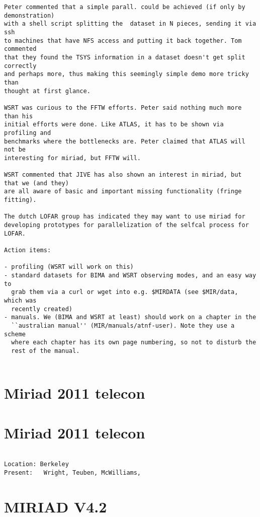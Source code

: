 \begin{verbatim}
Peter commented that a simple parall. could be achieved (if only by demonstration)
with a shell script splitting the  dataset in N pieces, sending it via ssh
to machines that have NFS access and putting it back together. Tom commented
that they found the TSYS information in a dataset doesn't get split correctly
and perhaps more, thus making this seemingly simple demo more tricky than
thought at first glance.

WSRT was curious to the FFTW efforts. Peter said nothing much more than his
initial efforts were done. Like ATLAS, it has to be shown via profiling and
benchmarks where the bottlenecks are. Peter claimed that ATLAS will not be
interesting for miriad, but FFTW will.

WSRT commented that JIVE has also shown an interest in miriad, but that we (and they)
are all aware of basic and important missing functionality (fringe fitting). 

The dutch LOFAR group has indicated they may want to use miriad for
developing prototypes for parallelization of the selfcal process for
LOFAR.

Action items:

- profiling (WSRT will work on this)
- standard datasets for BIMA and WSRT observing modes, and an easy way to
  grab them via a curl or wget into e.g. $MIRDATA (see $MIR/data, which was
  recently created)
- manuals. We (BIMA and WSRT at least) should work on a chapter in the
  ``australian manual'' (MIR/manuals/atnf-user). Note they use a scheme
  where each chapter has its own page numbering, so not to disturb the
  rest of the manual.


\end{verbatim}

\section{Miriad 2011 telecon}


\section{Miriad 2011 telecon}
\begin{verbatim}

Location: Berkeley
Present:   Wright, Teuben, McWilliams, 

\end{verbatim}


\section{MIRIAD V4.2}

